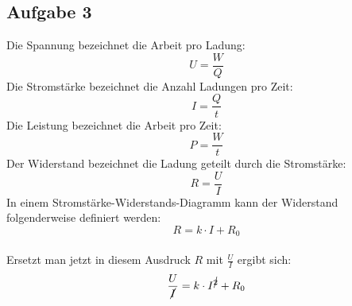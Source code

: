 \documentclass[12pt, a4paper, twoside]{article}
\begin{document}
    \subsection{Aufgabe 3}
    Die Spannung bezeichnet die Arbeit pro Ladung:
    \begin{equation}
        U = \frac{W}{Q}
    \end{equation}
    Die Stromstärke bezeichnet die Anzahl Ladungen pro Zeit:
    \begin{equation}
        I = \frac{Q}{t}
    \end{equation}
    Die Leistung bezeichnet die Arbeit pro Zeit:
    \begin{equation}
        P = \frac{W}{t}
    \end{equation}
    Der Widerstand bezeichnet die Ladung geteilt durch die Stromstärke:
    \begin{equation}
        R = \frac{U}{I}
    \end{equation}
    \newline
    In einem Stromstärke-Widerstands-Diagramm kann der Widerstand folgenderweise definiert werden:
    \[R = k \cdot I + R_0\]
    \vspace{0.5cm}\\
    Ersetzt man jetzt in diesem Ausdruck $R$ mit $\frac{U}{I}$ ergibt sich:
    \[\frac{U}{\cancel{I}} = k \cdot I^{\cancel{2}} + R_0\]
    
    \begin{center}
        \large
    \end{center}
\end{document}
